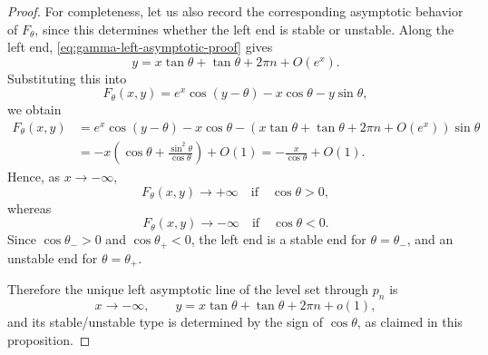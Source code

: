 \documentclass[10pt,a4paper]{amsart}
\begin{document}
\begin{proof}
For completeness, let us also record the corresponding asymptotic behavior of
\(F_\theta\), since this determines whether the left end is stable or unstable.
Along the left end, \eqref{eq:gamma-left-asymptotic-proof} gives
\[
y
=
x\tan\theta
+
\tan\theta
+
2\pi n
+
O(e^x).
\]
Substituting this into
\[
F_\theta(x,y)
=
e^x\cos(y-\theta)
-
x\cos\theta
-
y\sin\theta,
\]
we obtain
\[
\begin{aligned}
F_\theta(x,y)
&=
e^x\cos(y-\theta)
-
x\cos\theta
-
\left(
x\tan\theta+\tan\theta+2\pi n+O(e^x)
\right)\sin\theta  \\
&=
-
x\left(
\cos\theta+\frac{\sin^2\theta}{\cos\theta}
\right)
+O(1)=
-\frac{x}{\cos\theta}+O(1).
\end{aligned}
\]
Hence, as \(x\to-\infty\),
\[
F_\theta(x,y)\to+\infty
\quad\text{if}\quad
\cos\theta>0,
\]
whereas
\[
F_\theta(x,y)\to-\infty
\quad\text{if}\quad
\cos\theta<0.
\]
Since \(\cos\theta_->0\) and \(\cos\theta_+<0\), the left end is a stable end
for \(\theta=\theta_-\), and an unstable end for \(\theta=\theta_+\).

Therefore the unique left asymptotic line of the level set through \(p_n\) is
\[
x\to-\infty,
\qquad
y
=
x\tan\theta
+
\tan\theta
+
2\pi n
+
o(1),
\]
and its stable/unstable type is determined by the sign of \(\cos\theta\), as
claimed in this proposition.
\end{proof}
\end{document}
